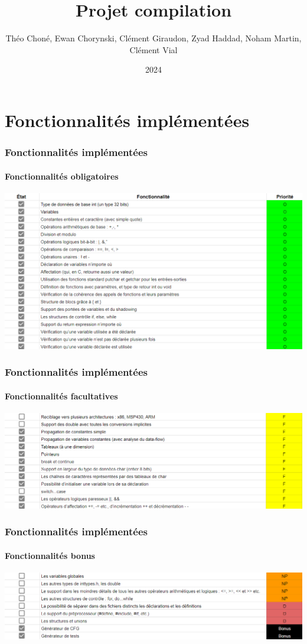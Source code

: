 \documentclass{beamer}
\title[Projet compilation]{Projet compilation}
\author[Hexanomnom]{Théo Choné, Ewan Chorynski, Clément Giraudon, Zyad Haddad, Noham Martin, Clément Vial}
\institute[INSA Lyon]{INSA Lyon}
\date{2024}
\begin{document}
\frame{\titlepage}


\section{Fonctionnalités implémentées}

\begin{frame}
    \frametitle{Fonctionnalités implémentées}
    \framesubtitle{Fonctionnalités obligatoires}
    \begin{center}
        \includegraphics[width=\textwidth,height=0.8\textheight,keepaspectratio]{fonctionnalite1.png}
    \end{center}
\end{frame}

\begin{frame}
    \frametitle{Fonctionnalités implémentées}
    \framesubtitle{Fonctionnalités facultatives}
    \begin{center}
        \includegraphics[width=\textwidth,height=0.8\textheight,keepaspectratio]{fonctionnalite2.png}
    \end{center}
\end{frame}

\begin{frame}
    \frametitle{Fonctionnalités implémentées}
    \framesubtitle{Fonctionnalités bonus}
    \begin{center}
        \includegraphics[width=\textwidth,height=0.8\textheight,keepaspectratio]{fonctionnalite3.png}
    \end{center}
\end{frame}
\end{document}
